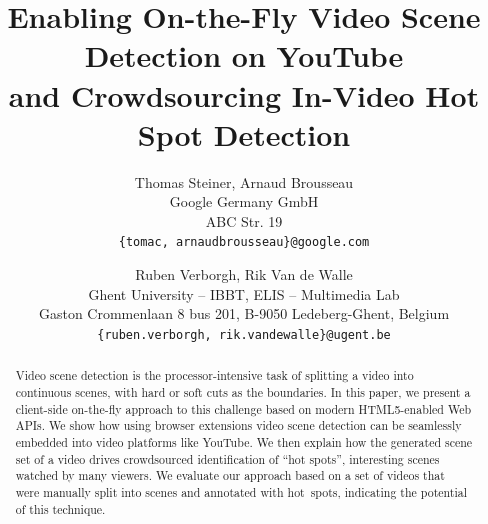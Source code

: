 \documentclass[10pt,twocolumn,letterpaper]{article}
\begin{document}
\title{Enabling On-the-Fly Video Scene Detection on YouTube\\ and Crowdsourcing In-Video Hot Spot Detection}

\author{Thomas Steiner, Arnaud Brousseau\\
Google Germany GmbH\\
ABC Str. 19\\
{\tt\small \{tomac, arnaudbrousseau\}@google.com}
\and
Ruben Verborgh, Rik Van de Walle \\
Ghent University -- IBBT, ELIS -- Multimedia Lab\\
Gaston Crommenlaan 8 bus 201, B-9050 Ledeberg-Ghent, Belgium\\
{\tt\small \{ruben.verborgh, rik.vandewalle\}@ugent.be}
}

\maketitle

\begin{abstract}
Video scene detection is the processor-intensive task of splitting a video into continuous scenes, with hard or soft cuts as the boundaries. In this paper, we present a client-side on-the-fly approach to this challenge based on modern HTML5-enabled Web APIs. We show how using browser extensions video scene detection can be seamlessly embedded into video platforms like YouTube.
We then explain how the generated scene set of a video drives crowdsourced identification of ``hot spots'', interesting scenes watched by many viewers. We evaluate our approach based on a set of videos that were manually split into scenes and annotated with hot~spots, indicating the potential of this technique.
\end{abstract}

\end{document}
